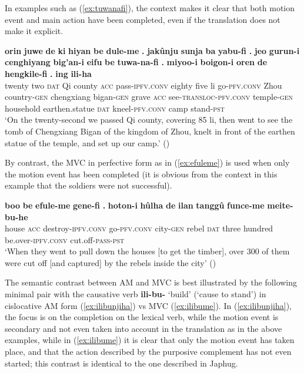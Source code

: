 \documentclass{article}
\newcommand{\ipa}[1]{\textbf{{\phon\mbox{#1}}}} %
\begin{document}
In examples such as (\ref{ex:tuwanafi}), the context makes it clear that both motion event and main action have been completed, even if the translation does not make it explicit.

\begin{exe}
\ex \label{ex:tuwanafi}
\gll
\ipa{orin} 	\ipa{juwe} 	\ipa{de} 	\ipa{ki} 	\ipa{hiyan} 	\ipa{be} 	\ipa{dule-me} 	\ipa{.} 	\ipa{jakûnju} 	\ipa{sunja} 	\ipa{ba} 	\ipa{yabu-fi} 	\ipa{.} 	\ipa{jeo} 	\ipa{gurun-i} 	\ipa{cenghiyang} 	\ipa{big’an-i} 	\ipa{eifu} 	\ipa{be} 	\ipa{tuwa-na-fi} 	\ipa{.} 	\ipa{miyoo-i} 	\ipa{boigon-i} 	\ipa{oren} 	\ipa{de} 	\ipa{hengkile-fi} 	\ipa{.} 	\ipa{ing} 	\ipa{ili-ha} \\
twenty two \textsc{dat} Qi county \textsc{acc} pass-\textsc{ipfv.conv} { } eighty five li  go-\textsc{pfv.conv} { } Zhou country-\textsc{gen} chengxiang bigan-\textsc{gen} grave \textsc{acc} see-\textsc{transloc-pfv.conv} { } temple-\textsc{gen} household earthen.statue \textsc{dat} kneel-\textsc{pfv.conv} { } camp stand-\textsc{pst} \\
\glt `On the twenty-second we passed Qi county, covering 85 li, then went to see the tomb of Chengxiang Bigan of the kingdom of Zhou, knelt in front of the earthen statue of the temple, and set up our camp.' (\citealt[83/103]{cosmo06dzengseo})
\end{exe}

By contrast, the MVC in perfective form as in (\ref{ex:efuleme}) is used when only the motion event has been completed (it is obvious from the context in this example that the soldiers were not successful).

\begin{exe}
\ex \label{ex:efuleme}
\gll
 \ipa{boo} 	\ipa{be} 	\ipa{efule-me} 	\ipa{gene-fi} 	\ipa{.} 	\ipa{hoton-i} 	\ipa{hûlha} 	\ipa{de} 	\ipa{ilan} 	\ipa{tanggû} 	\ipa{funce-me} 	\ipa{meite-bu-he} \\
 house \textsc{acc} destroy-\textsc{ipfv.conv} go-\textsc{pfv.conv} { } city-\textsc{gen} rebel \textsc{dat} three hundred be.over-\textsc{ipfv.conv} cut.off-\textsc{pass-pst} \\
 \glt ‘When they went to pull down the houses [to get the timber], over 300 of them were cut off [and captured] by the rebels inside the city’ (\citealt[69/97]{cosmo06dzengseo})
\end{exe}

The semantic contrast between AM and MVC is best illustrated by the following minimal pair with the causative verb \ipa{ili-bu-} `build' (`cause to stand') in cislocative AM form (\ref{ex:ilibunjiha}) vs MVC (\ref{ex:ilibume}). In (\ref{ex:ilibunjiha}), the focus is on the completion on the lexical verb, while the motion event is secondary and not even taken into account in the translation as in the above examples, while in (\ref{ex:ilibume}) it is clear that only the motion event has taken place, and that the action described by the purposive complement has not even started; this contrast is identical to the one described in Japhug.
\end{document}
